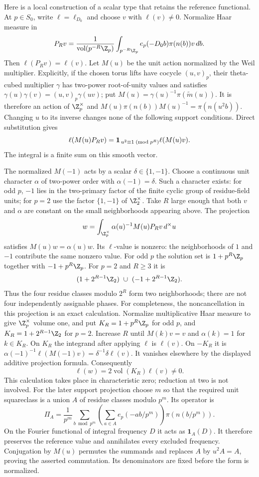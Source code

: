 Here is a local construction of a scalar type that retains the
reference functional. At $p\in S_0$, write $\ell=\ell_{D_0}$ and
choose $v$ with $\ell(v)\ne0$. Normalize Haar measure in
\[
 P_Rv=\frac1{\operatorname{vol}(p^{-R}\Z_p)}
       \int_{p^{-R}\Z_p}
          e_p(-D_0b)\pi(n(b))v\,db .
\]
Then $\ell(P_Rv)=\ell(v)$. Let $M(u)$ be the unit action normalized
by the Weil multiplier. Explicitly, if the chosen torus lifts have
cocycle $(u,v)_p$, their theta-cubed multiplier $\gamma$ has
two-power root-of-unity values and satisfies
$\gamma(u)\gamma(v)=(u,v)_p\gamma(uv)$; put
$M(u)=\gamma(u)^{-1}\pi(\widetilde m(u))$.
It is therefore an action of
$\Z_p^\times$ and
$M(u)\pi(n(b))M(u)^{-1}=\pi(n(u^2b))$.
Changing $u$ to its inverse changes none of the following support
conditions. Direct substitution gives
\[
 \ell(M(u)P_Rv)=
 {\bf1}_{\,u^2\equiv1\;(\mathrm{mod}\;p^R)}
                    \ell(M(u)v).
\]
The integral is a finite sum on this smooth vector.

The normalized $M(-1)$ acts by a scalar $\delta\in\{1,-1\}$.
Choose a continuous unit character $\alpha$ of two-power order
with $\alpha(-1)=\delta$. Such a character exists: for odd $p$,
$-1$ lies in the two-primary factor of the finite cyclic group
of residue-field units; for $p=2$ use the factor
$\{1,-1\}$ of $\Z_2^\times$.
Take $R$ large enough that both $v$ and $\alpha$ are constant on
the small neighborhoods appearing above. The projection
\[
 w=\int_{\Z_p^\times}\alpha(u)^{-1}M(u)P_Rv\,d^\times u
\]
satisfies $M(u)w=\alpha(u)w$. Its $\ell$-value is nonzero:
the neighborhoods of $1$ and $-1$ contribute the same nonzero
value. For odd $p$ the solution set is
$1+p^R\Z_p$ together with $-1+p^R\Z_p$.
For $p=2$ and $R\ge3$ it is
\[
 (1+2^{R-1}\Z_2)\ \cup\
 (-1+2^{R-1}\Z_2).
\]
Thus the four residue classes modulo $2^R$ form two neighborhoods;
there are not four independently assignable phases.
For completeness, the noncancellation in this projection is an exact
calculation. Normalize multiplicative Haar measure to give
$\Z_p^\times$ volume one, and put
$K_R=1+p^R\Z_p$ for odd $p$, and $K_R=1+2^{R-1}\Z_2$
for $p=2$. Increase $R$ until $M(k)v=v$ and $\alpha(k)=1$
for $k\in K_R$. On $K_R$ the integrand after applying $\ell$
is $\ell(v)$. On $-K_R$ it is
$\alpha(-1)^{-1}\ell(M(-1)v)=\delta^{-1}\delta\ell(v)$.
It vanishes elsewhere by the displayed additive projection formula.
Consequently
\[
                 \ell(w)=2\operatorname{vol}(K_R)\ell(v)\ne0.
\]
This calculation takes place in characteristic zero; reduction at two
is not involved. For the later support projection choose $m$ so that
the required unit squareclass is a union $A$ of residue classes modulo
$p^m$. Its operator is
\[
 \Pi_A=\frac1{p^m}\sum_{b\bmod p^m}
       \left(\sum_{a\in A}e_p(-ab/p^m)\right)\pi(n(b/p^m)).
\]
On the Fourier functional of integral frequency $D$ it acts as
$\mathbf1_A(D)$. It therefore preserves the reference value and
annihilates every excluded frequency. Conjugation by $M(u)$ permutes
the summands and replaces $A$ by $u^2A=A$, proving the asserted
commutation. Its denominators are fixed before the form is normalized.


